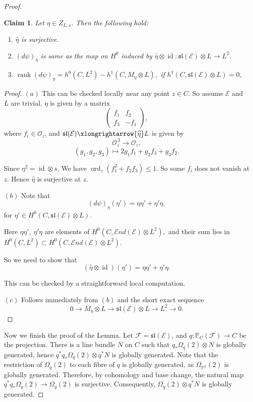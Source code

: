 \documentclass[11pt,letterpaper]{amsart}
\newtheorem{claim}[lemma]{Claim}
\begin{document}
\begin{proof}
\begin{claim}\label{etahat}
Let $\eta\in Z_{L,s}$. Then the following hold:

\begin{enumerate}
\item[(a)] $\widehat{\eta}$ is surjective.

\item[(b)] $(d\psi)_\eta$ is same as the map on $H^0$ induced by $\widehat{\eta}\otimes\operatorname{id}:\mathfrak{sl}(\mathcal{E})\otimes L\longrightarrow L^2.$

\item[(c)]
$\operatorname{rank}(d\psi)_\eta
=
h^0(C,L^2)-h^1(C,M_\eta\otimes L), $ if $h^1(C,\mathfrak{sl}(\mathcal{E})\otimes L)=0$,
\end{enumerate}
\end{claim}
\begin{proof}
$(a)$ This can be checked locally near any point $z\in C$.
So assume $\mathcal{E}$ and $L$ are trivial.
 $\eta$ is given by a matrix
\[
\begin{pmatrix}
f_1 & f_2\\
f_3 & -f_1
\end{pmatrix},
\]
where $f_i\in\mathcal{O}_{z}$,
and $
\mathfrak{sl}(\mathcal{E})
\xlongrightarrow{\widehat{\eta}}
L$
is given by
\[
\mathcal{O}_{z}^{\,3}
\longrightarrow
\mathcal{O}_{z},
\]
\[
(g_1,g_2,g_3)
\longmapsto
2g_1f_1+g_2f_3+g_3f_2.
\]

Since $\eta^2=\operatorname{id}\otimes s$, We have $\operatorname{ord}_z(f_1^2+f_2f_3)\le 1.$
So some $f_i$ does not vanish at $z$. Hence $\widehat{\eta}$
is surjective at $z$.

$(b)$ Note that
\[
(d\psi)_\eta(\eta')
=
\eta\eta'
+
\eta'\eta,
\]
for $\eta'\in H^0(C,\mathfrak{sl}(\mathcal{E})\otimes L).$

Here $\eta\eta',\ \eta'\eta$ are elements of 
$H^0\!\left(C,\mathcal{E}nd(\mathcal{E})\otimes L^2\right),$
and their sum lies in $H^0(C,L^2)
\subset
H^0\!\left(C,\mathcal{E}nd(\mathcal{E})\otimes L^2\right).$

So we need to show that
\[
(\widehat{\eta}\otimes\operatorname{id})(\eta')
=
\eta\eta'
+
\eta'\eta.
\]

This can be checked by a straightforward local computation.

\medskip

\noindent
$(c)$ Follows immediately from $(b)$ and the short exact sequence
\[
0
\longrightarrow
M_\eta\otimes L
\longrightarrow
\mathfrak{sl}(\mathcal{E})\otimes L
\longrightarrow
L^2
\longrightarrow
0.
\]
\end{proof}
Now we finish the proof of the Lemma. Let $\mathcal{F}=\mathfrak{sl}(\mathcal{E})$, and $q:\mathbb{P}_C(\mathcal{F})\to C$ be the projection. There is a line bundle $N$ on $C$ such that $q_*\Omega_q(2)\otimes N$ is globally generated, hence $q^*q_*\Omega_q(2)\otimes q^*N$ is globally generated. Note that the restriction of $\Omega_q(2)$ to each fibre of $q$ is globally generated, as $\Omega_{\mathbb{P}^2}(2)$ is globally generated. Therefore, by cohomology and base change, the natural map $q^*q_*\Omega_q(2)\longrightarrow \Omega_q(2)$
is surjective. Consequently, $\Omega_q(2)\otimes q^*N$ is globally generated.


\end{proof}
\end{document}
